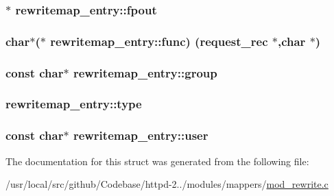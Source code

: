 \subsubsection[{\texorpdfstring{fpout}{fpout}}]{$\ast$ rewritemap\+\_\+entry\+::fpout}\hypertarget{structrewritemap__entry_a53da7dfad3a76b4258b9a12a88f9a5f0}{}\label{structrewritemap__entry_a53da7dfad3a76b4258b9a12a88f9a5f0}
\subsubsection[{\texorpdfstring{func}{func}}]{\setlength{\rightskip}{0pt plus 5cm}char$\ast$($\ast$ rewritemap\+\_\+entry\+::func) ({\bf request\+\_\+rec} $\ast$,char $\ast$)}\hypertarget{structrewritemap__entry_af06ea2757484e82f18c1cb43d9db01f1}{}\label{structrewritemap__entry_af06ea2757484e82f18c1cb43d9db01f1}
\subsubsection[{\texorpdfstring{group}{group}}]{\setlength{\rightskip}{0pt plus 5cm}const char$\ast$ rewritemap\+\_\+entry\+::group}\hypertarget{structrewritemap__entry_ae2de4c69f147571314aa947d5341e0a1}{}\label{structrewritemap__entry_ae2de4c69f147571314aa947d5341e0a1}
\subsubsection[{\texorpdfstring{type}{type}}]{ rewritemap\+\_\+entry\+::type}\hypertarget{structrewritemap__entry_a9626591579ea6e130cb53fb60d9ae2df}{}\label{structrewritemap__entry_a9626591579ea6e130cb53fb60d9ae2df}
\subsubsection[{\texorpdfstring{user}{user}}]{\setlength{\rightskip}{0pt plus 5cm}const char$\ast$ rewritemap\+\_\+entry\+::user}\hypertarget{structrewritemap__entry_a12d560276f740483daf38f8d1a172c76}{}\label{structrewritemap__entry_a12d560276f740483daf38f8d1a172c76}


The documentation for this struct was generated from the following file\+:\begin{DoxyCompactItemize}
\item 
/usr/local/src/github/\+Codebase/httpd-\/2../modules/mappers/\hyperlink{mod__rewrite_8c}{mod\+\_\+rewrite.\+c}\end{DoxyCompactItemize}
